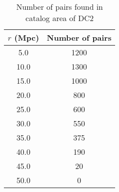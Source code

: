 \begin{table}
\begin{centering}
\begin{tabular}{|c|c|}
    \hline
    $r$ (Mpc) &  Number of pairs \\
\hline
  5.0 &  1200 \\
 10.0 &  1300 \\
 15.0 &  1000 \\
 20.0 &   800 \\
 25.0 &   600 \\
 30.0 &   550 \\
 35.0 &   375 \\
 40.0 &   190 \\
 45.0 &    20 \\
 50.0 &     0 \\
\hline
\end{tabular}
\end{centering}
\caption{Number of pairs found in catalog area of DC2}
\label{tab:numpairscat}
\end{table}

